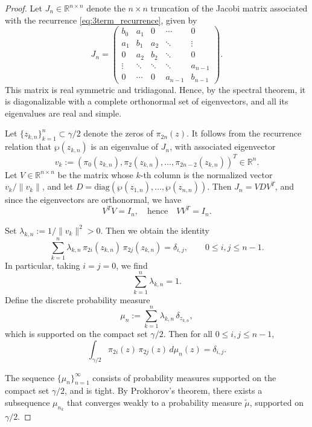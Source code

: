 \documentclass[11pt,a4paper]{article}
\theoremstyle{definition}
\numberwithin{equation}{section}
\numberwithin{theorem}{section}
\begin{document}
\begin{proof}
Let \( J_n \in \mathbb{R}^{n \times n} \) denote the \( n \times n \) truncation of the Jacobi matrix associated with the recurrence \eqref{eq:3term_recurrence}, given by
\begin{equation}
J_n = \begin{pmatrix}
    b_0 & a_1 & 0 & \cdots & 0 \\
    a_1 & b_1 & a_2 & \ddots & \vdots \\
    0 & a_2 & b_2 & \ddots & 0 \\
    \vdots & \ddots & \ddots & \ddots & a_{n-1} \\
    0 & \cdots & 0 & a_{n-1} & b_{n-1}
\end{pmatrix}.
\end{equation}
This matrix is real symmetric and tridiagonal. Hence, by the spectral theorem, it is diagonalizable with a complete orthonormal set of eigenvectors, and all its eigenvalues are real and simple.

Let \( \{z_{k,n}\}_{k=1}^n \subset \gamma/2 \) denote the zeros of \( \pi_{2n}(z) \). It follows from the recurrence relation that \( \wp(z_{k,n}) \) is an eigenvalue of \( J_n \), with associated eigenvector
\[
v_k := \left( \pi_0(z_{k,n}), \pi_2(z_{k,n}), \dots, \pi_{2n-2}(z_{k,n}) \right)^T \in \mathbb{R}^n.
\]
Let \( V \in \mathbb{R}^{n \times n} \) be the matrix whose \( k \)-th column is the normalized vector \( v_k / \|v_k\| \), and let \( D = \mathrm{diag}(\wp(z_{1,n}), \dots, \wp(z_{n,n})) \). Then \( J_n = V D V^T \), and since the eigenvectors are orthonormal, we have
\[
V^T V = I_n, \quad \text{hence} \quad VV^T = I_n.
\]

Set \( \lambda_{k,n} := 1 / \|v_k\|^2 > 0 \). Then we obtain the identity
\begin{equation}
    \sum_{k=1}^n \lambda_{k,n} \, \pi_{2i}(z_{k,n}) \, \pi_{2j}(z_{k,n}) = \delta_{i,j}, \qquad 0 \leq i,j \leq n-1.
\end{equation}
In particular, taking \( i = j = 0 \), we find
\[
\sum_{k=1}^n \lambda_{k,n} = 1.
\]
Define the discrete probability measure
\[
\mu_n := \sum_{k=1}^n \lambda_{k,n} \, \delta_{z_{k,n}},
\]
which is supported on the compact set \( \gamma/2\). Then for all \( 0 \leq i, j \leq n-1 \),
\begin{equation}
    \int_{\gamma/2} \pi_{2i}(z)\, \pi_{2j}(z) \, d\mu_n(z) = \delta_{i,j}.
\end{equation}

The sequence \( \{\mu_n\}_{n=1}^\infty \) consists of probability measures supported on the compact set \( \gamma/2 \), and  is tight. By Prokhorov's theorem, there exists a subsequence \( \mu_{n_k} \) that converges weakly to a probability measure \( \tilde{\mu} \), supported on \( \gamma/2 \).


\end{proof}
\end{document}
